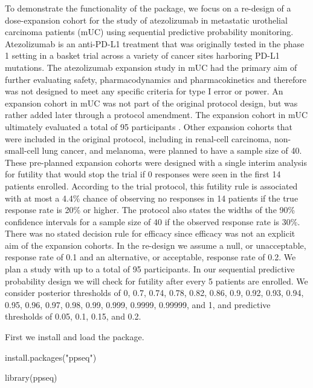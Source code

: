 To demonstrate the functionality of the  package, we
focus on a re-design of a dose-expansion cohort for the study of
atezolizumab in metastatic urothelial carcinoma patients (mUC) using
sequential predictive probability monitoring. Atezolizumab is an
anti-PD-L1 treatment that was originally tested in the phase 1 setting
in a basket trial across a variety of cancer sites harboring PD-L1
mutations. The atezolizumab expansion study in mUC had the primary aim
of further evaluating safety, pharmacodynamics and pharmacokinetics and
therefore was not designed to meet any specific criteria for type I
error or power. An expansion cohort in mUC was not part of the original
protocol design, but was rather added later through a protocol
amendment. The expansion cohort in mUC ultimately evaluated a total of
95 participants \citep{Powles2014}. Other expansion cohorts that were
included in the original protocol, including in renal-cell carcinoma,
non-small-cell lung cancer, and melanoma, were planned to have a sample
size of 40. These pre-planned expansion cohorts were designed with a
single interim analysis for futility that would stop the trial if 0
responses were seen in the first 14 patients enrolled. According to the
trial protocol, this futility rule is associated with at most a 4.4\%
chance of observing no responses in 14 patients if the true response
rate is 20\% or higher. The protocol also states the widths of the 90\%
confidence intervals for a sample size of 40 if the observed response
rate is 30\%. There was no stated decision rule for efficacy since
efficacy was not an explicit aim of the expansion cohorts. In the
re-design we assume a null, or unacceptable, response rate of 0.1 and an
alternative, or acceptable, response rate of 0.2. We plan a study with
up to a total of 95 participants. In our sequential predictive
probability design we will check for futility after every 5 patients are
enrolled. We consider posterior thresholds of 0, 0.7, 0.74, 0.78, 0.82,
0.86, 0.9, 0.92, 0.93, 0.94, 0.95, 0.96, 0.97, 0.98, 0.99, 0.999,
0.9999, 0.99999, and 1, and predictive thresholds of 0.05, 0.1, 0.15,
and 0.2.

First we install and load the  package.

\begin{Schunk}
\begin{Sinput}
install.packages("ppseq")
\end{Sinput}
\end{Schunk}

\begin{Schunk}
\begin{Sinput}
library(ppseq)
\end{Sinput}
\end{Schunk}

